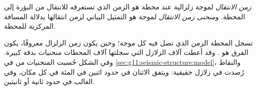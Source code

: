 \begin{definition}\label{def:g11:seismic-structure:travel-time}
\emph{زمن الانتقال} لموجة زلزالية عند محطة هو
الزمن الذي تستغرقه للانتقال من البؤرة إلى المحطة. و\emph{منحنى زمن
الانتقال} لموجة هو التمثيل البياني
لزمن انتقالها بدلالة المسافة المركزية للمحطة.
\end{definition}

تسجل المحطة الزمن الذي تصل فيه كل موجة؛ وحين يكون زمن
الزلزال معروفًا، يكون الفرق هو . وقد أعطت آلاف
الزلازل التي سجلتها آلاف المحطات منحنيات 
بدقة كبيرة. وفي الشكل حُسبت المنحنيات من
 في \cref{sec:g11:seismic-structure:model}، والنقاط
 رُصدت في زلازل حقيقية: ويتفق الاثنان في حدود
اثنين في المئة في كل مكان، وفي الغالب في حدود ثانية أو ثانيتين.

